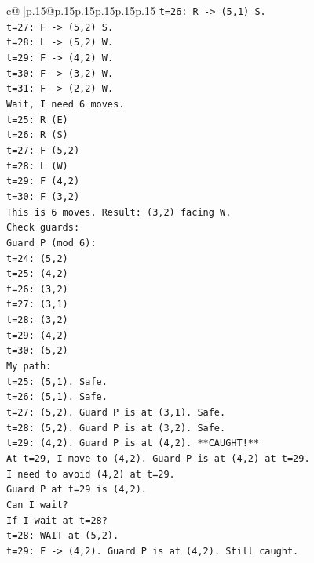 \documentclass{article}
\begin{document}
{\begin{supertabular}{c@{$\;$}|p{.15\linewidth}@{}p{.15\linewidth}p{.15\linewidth}p{.15\linewidth}p{.15\linewidth}p{.15\linewidth}}
{{{\texttt{t=26: R {-}> (5,1) S.} \\
\texttt{t=27: F {-}> (5,2) S.} \\
\texttt{t=28: L {-}> (5,2) W.} \\
\texttt{t=29: F {-}> (4,2) W.} \\
\texttt{t=30: F {-}> (3,2) W.} \\
\texttt{t=31: F {-}> (2,2) W.} \\
\texttt{Wait, I need 6 moves.} \\
\texttt{t=25: R (E)} \\
\texttt{t=26: R (S)} \\
\texttt{t=27: F (5,2)} \\
\texttt{t=28: L (W)} \\
\texttt{t=29: F (4,2)} \\
\texttt{t=30: F (3,2)} \\
\texttt{This is 6 moves. Result: (3,2) facing W.} \\
\texttt{Check guards:} \\
\texttt{Guard P (mod 6):} \\
\texttt{t=24: (5,2)} \\
\texttt{t=25: (4,2)} \\
\texttt{t=26: (3,2)} \\
\texttt{t=27: (3,1)} \\
\texttt{t=28: (3,2)} \\
\texttt{t=29: (4,2)} \\
\texttt{t=30: (5,2)} \\
\texttt{My path:} \\
\texttt{t=25: (5,1). Safe.} \\
\texttt{t=26: (5,1). Safe.} \\
\texttt{t=27: (5,2). Guard P is at (3,1). Safe.} \\
\texttt{t=28: (5,2). Guard P is at (3,2). Safe.} \\
\texttt{t=29: (4,2). Guard P is at (4,2). **CAUGHT!**} \\
\texttt{At t=29, I move to (4,2). Guard P is at (4,2) at t=29.} \\
\texttt{I need to avoid (4,2) at t=29.} \\
\texttt{Guard P at t=29 is (4,2).} \\
\texttt{Can I wait?} \\
\texttt{If I wait at t=28?} \\
\texttt{t=28: WAIT at (5,2).} \\
\texttt{t=29: F {-}> (4,2). Guard P is at (4,2). Still caught.} \\
}}}
\end{supertabular}}
\end{document}

